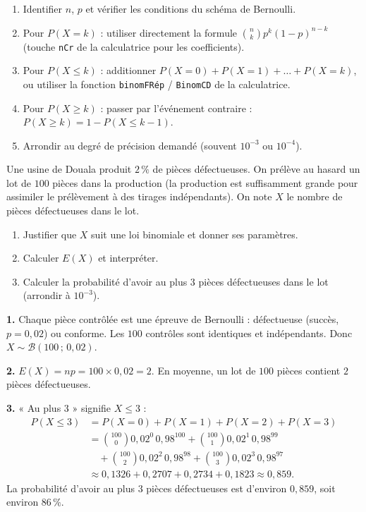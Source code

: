 \documentclass[11pt]{article}
\begin{document}
\begin{methode}[Calculer $P(X = k)$, $P(X \leq k)$ ou $P(X \geq k)$]
\begin{enumerate}
\item Identifier $n$, $p$ et vérifier les conditions du schéma de Bernoulli.
\item Pour $P(X = k)$ : utiliser directement la formule $\binom{n}{k} p^k (1-p)^{n-k}$ (touche \texttt{nCr} de la calculatrice pour les coefficients).
\item Pour $P(X \leq k)$ : additionner $P(X=0) + P(X=1) + \dots + P(X=k)$, ou utiliser la fonction \texttt{binomFRép} / \texttt{BinomCD} de la calculatrice.
\item Pour $P(X \geq k)$ : passer par l'événement contraire : $P(X \geq k) = 1 - P(X \leq k-1)$.
\item Arrondir au degré de précision demandé (souvent $10^{-3}$ ou $10^{-4}$).
\end{enumerate}
\end{methode}

\begin{exoresolu}
Une usine de Douala produit $2\,\%$ de pièces défectueuses. On prélève au hasard un lot de $100$ pièces dans la production (la production est suffisamment grande pour assimiler le prélèvement à des tirages indépendants). On note $X$ le nombre de pièces défectueuses dans le lot.
\begin{enumerate}
\item Justifier que $X$ suit une loi binomiale et donner ses paramètres.
\item Calculer $E(X)$ et interpréter.
\item Calculer la probabilité d'avoir au plus $3$ pièces défectueuses dans le lot (arrondir à $10^{-3}$).
\end{enumerate}
\tcblower
\textbf{1.} Chaque pièce contrôlée est une épreuve de Bernoulli : défectueuse (succès, $p = 0{,}02$) ou conforme. Les $100$ contrôles sont identiques et indépendants. Donc $X \sim \mathcal{B}(100\,;\,0{,}02)$.

\textbf{2.} $E(X) = np = 100 \times 0{,}02 = 2$. En moyenne, un lot de $100$ pièces contient $2$ pièces défectueuses.

\textbf{3.} « Au plus $3$ » signifie $X \leq 3$ :
\begin{align*}
P(X \leq 3) &= P(X=0) + P(X=1) + P(X=2) + P(X=3)\\
&= \binom{100}{0} 0{,}02^0\, 0{,}98^{100} + \binom{100}{1} 0{,}02^1\, 0{,}98^{99} \\
&\quad + \binom{100}{2} 0{,}02^2\, 0{,}98^{98} + \binom{100}{3} 0{,}02^3\, 0{,}98^{97}\\
&\approx 0{,}1326 + 0{,}2707 + 0{,}2734 + 0{,}1823 \approx 0{,}859.
\end{align*}
La probabilité d'avoir au plus $3$ pièces défectueuses est d'environ $0{,}859$, soit environ $86\,\%$.
\end{exoresolu}
\end{document}
